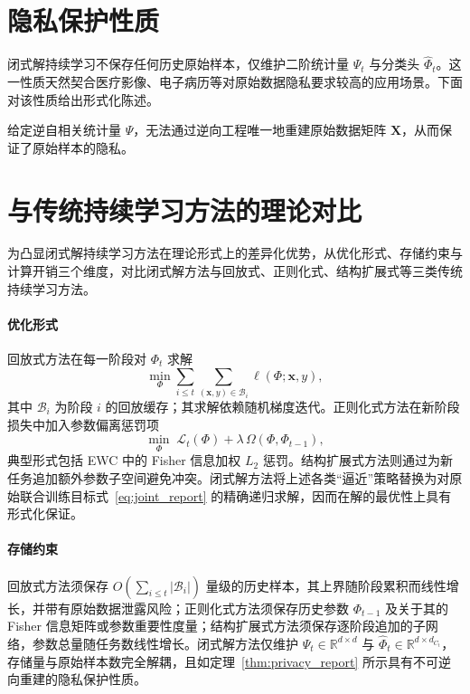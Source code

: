 \section{隐私保护性质}

闭式解持续学习不保存任何历史原始样本，仅维护二阶统计量 $\Psi_t$ 与分类头 $\widehat{\Phi}_t$。这一性质天然契合医疗影像、电子病历等对原始数据隐私要求较高的应用场景。下面对该性质给出形式化陈述。

\begin{theorem}[隐私保护性]\label{thm:privacy_report}
给定逆自相关统计量 $\Psi$，无法通过逆向工程唯一地重建原始数据矩阵 $\mathbf{X}$，从而保证了原始样本的隐私。
\end{theorem}



\section{与传统持续学习方法的理论对比}

为凸显闭式解持续学习方法在理论形式上的差异化优势，从优化形式、存储约束与计算开销三个维度，对比闭式解方法与回放式、正则化式、结构扩展式等三类传统持续学习方法。

\paragraph{优化形式} 回放式方法在每一阶段对 $\Phi_t$ 求解
\begin{equation}
\min_{\Phi}\sum_{i\le t}\sum_{(\mathbf{x},y)\in\mathcal{B}_i}\ell(\Phi;\mathbf{x},y),
\label{eq:replay_obj_report}
\end{equation}
其中 $\mathcal{B}_i$ 为阶段 $i$ 的回放缓存；其求解依赖随机梯度迭代。正则化式方法在新阶段损失中加入参数偏离惩罚项
\begin{equation}
\min_{\Phi}\;\mathcal{L}_t(\Phi)+\lambda\,\Omega(\Phi,\Phi_{t-1}),
\label{eq:reg_obj_report}
\end{equation}
典型形式包括 EWC 中的 Fisher 信息加权 $L_2$ 惩罚。结构扩展式方法则通过为新任务追加额外参数子空间避免冲突。闭式解方法将上述各类“逼近”策略替换为对原始联合训练目标式~\eqref{eq:joint_report} 的精确递归求解，因而在解的最优性上具有形式化保证。

\paragraph{存储约束} 回放式方法须保存 $O(\sum_{i\le t} |\mathcal{B}_i|)$ 量级的历史样本，其上界随阶段累积而线性增长，并带有原始数据泄露风险；正则化式方法须保存历史参数 $\Phi_{t-1}$ 及关于其的 Fisher 信息矩阵或参数重要性度量；结构扩展式方法须保存逐阶段追加的子网络，参数总量随任务数线性增长。闭式解方法仅维护 $\Psi_t\in\mathbb{R}^{d\times d}$ 与 $\widehat{\Phi}_t\in\mathbb{R}^{d\times d_{C_t}}$，存储量与原始样本数完全解耦，且如定理~\ref{thm:privacy_report} 所示具有不可逆向重建的隐私保护性质。

